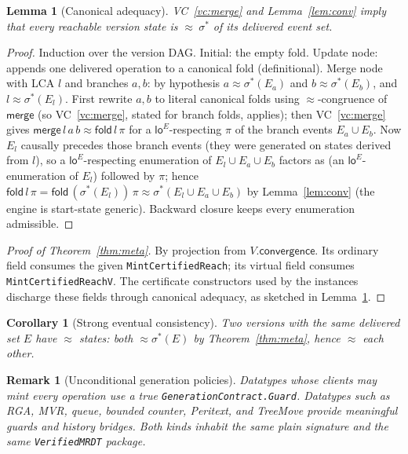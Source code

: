 \documentclass[11pt]{article}
\newtheorem{lemma}[theorem]{Lemma}
\newtheorem{corollary}[theorem]{Corollary}
\newtheorem{remark}[theorem]{Remark}
\newcommand{\loE}[1]{\mathsf{lo}^{#1}}
\newcommand{\lean}[1]{\texttt{#1}}
\newcommand{\st}{\sigma}
\newcommand{\merge}{\mathsf{merge}}
\newcommand{\eqobs}{\approx}
\newcommand{\fold}{\mathsf{fold}}
\newcommand{\sigmacan}{\st^{\ast}}
\begin{document}
\begin{lemma}[Canonical adequacy]\label{lem:adeq}
VC~\ref{vc:merge} and Lemma~\ref{lem:conv} imply that every reachable version state is
$\eqobs\ \sigmacan$ of its delivered event set.
\end{lemma}
\begin{proof}
Induction over the version DAG. Initial: the empty fold. Update node: appends one delivered
operation to a canonical fold (definitional). Merge node with LCA $l$ and branches $a,b$: by
hypothesis $a \eqobs \sigmacan(E_a)$ and $b \eqobs \sigmacan(E_b)$, and $l \eqobs
\sigmacan(E_l)$. First rewrite $a,b$ to literal canonical folds using $\eqobs$-congruence of
$\merge$ (so VC~\ref{vc:merge}, stated for branch folds, applies); then VC~\ref{vc:merge}
gives $\merge\,l\,a\,b \eqobs \fold\,l\,\pi$ for a $\loE{E}$-respecting $\pi$ of the branch
events $E_a \cup E_b$. Now $E_l$ causally precedes those branch events (they were generated on
states derived from $l$), so a $\loE{E}$-respecting enumeration of $E_l \cup E_a \cup E_b$
factors as (an $\loE{E}$-enumeration of $E_l$) followed by $\pi$; hence
$\fold\,l\,\pi = \fold\,(\sigmacan(E_l))\,\pi \eqobs \sigmacan(E_l \cup E_a \cup E_b)$ by
Lemma~\ref{lem:conv} (the engine is start-state generic). Backward closure keeps every
enumeration admissible.
\end{proof}

\begin{proof}[Proof of Theorem~\ref{thm:meta}]
By projection from $V.\mathsf{convergence}$. Its ordinary field consumes the
given \lean{MintCertifiedReach}; its virtual field consumes
\lean{MintCertifiedReachV}. The certificate constructors used by the instances
discharge these fields through canonical adequacy, as sketched in
Lemma~\ref{lem:adeq}.
\end{proof}

\begin{corollary}[Strong eventual consistency]\label{cor:sec}
Two versions with the same delivered set $E$ have $\eqobs$ states: both $\eqobs \sigmacan(E)$
by Theorem~\ref{thm:meta}, hence $\eqobs$ each other.
\end{corollary}

\begin{remark}[Unconditional generation policies]
Datatypes whose clients may mint every operation use a true
\lean{GenerationContract.Guard}. Datatypes such as RGA, MVR, queue, bounded
counter, Peritext, and TreeMove provide meaningful guards and history bridges.
Both kinds inhabit the same plain signature and the same \lean{VerifiedMRDT}
package.
\end{remark}
\end{document}
